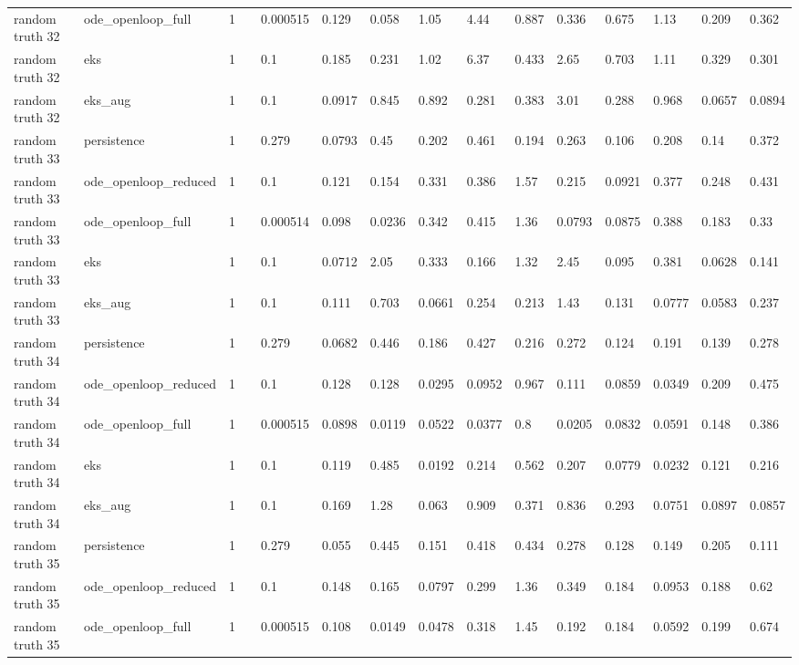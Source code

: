 \begin{table}[t]
\begin{tabular}{lllllllllllllll}
random truth 32 & ode\_openloop\_full & 1 &  & 0.000515 & 0.129 & 0.058 & 1.05 & 4.44 & 0.887 & 0.336 & 0.675 & 1.13 & 0.209 & 0.362 \\
random truth 32 & eks & 1 &  & 0.1 & 0.185 & 0.231 & 1.02 & 6.37 & 0.433 & 2.65 & 0.703 & 1.11 & 0.329 & 0.301 \\
random truth 32 & eks\_aug & 1 &  & 0.1 & 0.0917 & 0.845 & 0.892 & 0.281 & 0.383 & 3.01 & 0.288 & 0.968 & 0.0657 & 0.0894 \\
random truth 33 & persistence & 1 &  & 0.279 & 0.0793 & 0.45 & 0.202 & 0.461 & 0.194 & 0.263 & 0.106 & 0.208 & 0.14 & 0.372 \\
random truth 33 & ode\_openloop\_reduced & 1 &  & 0.1 & 0.121 & 0.154 & 0.331 & 0.386 & 1.57 & 0.215 & 0.0921 & 0.377 & 0.248 & 0.431 \\
random truth 33 & ode\_openloop\_full & 1 &  & 0.000514 & 0.098 & 0.0236 & 0.342 & 0.415 & 1.36 & 0.0793 & 0.0875 & 0.388 & 0.183 & 0.33 \\
random truth 33 & eks & 1 &  & 0.1 & 0.0712 & 2.05 & 0.333 & 0.166 & 1.32 & 2.45 & 0.095 & 0.381 & 0.0628 & 0.141 \\
random truth 33 & eks\_aug & 1 &  & 0.1 & 0.111 & 0.703 & 0.0661 & 0.254 & 0.213 & 1.43 & 0.131 & 0.0777 & 0.0583 & 0.237 \\
random truth 34 & persistence & 1 &  & 0.279 & 0.0682 & 0.446 & 0.186 & 0.427 & 0.216 & 0.272 & 0.124 & 0.191 & 0.139 & 0.278 \\
random truth 34 & ode\_openloop\_reduced & 1 &  & 0.1 & 0.128 & 0.128 & 0.0295 & 0.0952 & 0.967 & 0.111 & 0.0859 & 0.0349 & 0.209 & 0.475 \\
random truth 34 & ode\_openloop\_full & 1 &  & 0.000515 & 0.0898 & 0.0119 & 0.0522 & 0.0377 & 0.8 & 0.0205 & 0.0832 & 0.0591 & 0.148 & 0.386 \\
random truth 34 & eks & 1 &  & 0.1 & 0.119 & 0.485 & 0.0192 & 0.214 & 0.562 & 0.207 & 0.0779 & 0.0232 & 0.121 & 0.216 \\
random truth 34 & eks\_aug & 1 &  & 0.1 & 0.169 & 1.28 & 0.063 & 0.909 & 0.371 & 0.836 & 0.293 & 0.0751 & 0.0897 & 0.0857 \\
random truth 35 & persistence & 1 &  & 0.279 & 0.055 & 0.445 & 0.151 & 0.418 & 0.434 & 0.278 & 0.128 & 0.149 & 0.205 & 0.111 \\
random truth 35 & ode\_openloop\_reduced & 1 &  & 0.1 & 0.148 & 0.165 & 0.0797 & 0.299 & 1.36 & 0.349 & 0.184 & 0.0953 & 0.188 & 0.62 \\
random truth 35 & ode\_openloop\_full & 1 &  & 0.000515 & 0.108 & 0.0149 & 0.0478 & 0.318 & 1.45 & 0.192 & 0.184 & 0.0592 & 0.199 & 0.674 \\

\end{tabular}
\end{table}
